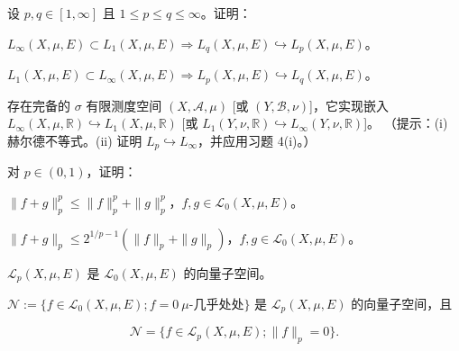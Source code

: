 \begin{exercises}
\begin{subitems}
\end{subitems}

\item

设 $ p,q \in [1,\infty] $ 且 $ 1 \le p \le q \le \infty $。证明：

\begin{subitems}
\item

$ L_\infty(X,\mu,E) \subset L_1(X,\mu,E) \Rightarrow L_q(X,\mu,E) \hookrightarrow L_p(X,\mu,E) $。

\item

$ L_1(X,\mu,E) \subset L_\infty(X,\mu,E) \Rightarrow L_p(X,\mu,E) \hookrightarrow L_q(X,\mu,E) $。

\item

存在完备的 $ \sigma $ 有限测度空间 $ (X,\mathcal{A},\mu) $ [或 $ (Y,\mathcal{B},\nu) $]，它实现嵌入 $ L_\infty(X,\mu,\mathbb{R}) \hookrightarrow L_1(X,\mu,\mathbb{R}) $ [或 $ L_1(Y,\nu,\mathbb{R}) \hookrightarrow L_\infty(Y,\nu,\mathbb{R}) $]。
（提示：(i) 赫尔德不等式。(ii) 证明 $ L_p \hookrightarrow L_\infty $，并应用习题 4(i)。）

\end{subitems}

\item

对 $ p \in (0,1) $，证明：

\begin{subitems}
\item

$ \|f+g\|_p^p \le \|f\|_p^p + \|g\|_p^p $，$ f,g \in \mathcal{L}_0(X,\mu,E) $。

\item

$ \|f+g\|_p \le 2^{1/p-1}(\|f\|_p + \|g\|_p) $，$ f,g \in \mathcal{L}_0(X,\mu,E) $。

\item

$ \mathcal{L}_p(X,\mu,E) $ 是 $ \mathcal{L}_0(X,\mu,E) $ 的向量子空间。

\item

$ \mathcal{N} := \{ f \in \mathcal{L}_0(X,\mu,E) ; f = 0 \ \mu\text{-几乎处处} \} $ 是 $ \mathcal{L}_p(X,\mu,E) $ 的向量子空间，且

\[
\mathcal{N} = \{ f \in \mathcal{L}_p(X,\mu,E) ; \|f\|_p = 0 \} .
\]
\item


\end{subitems}
\end{exercises}

